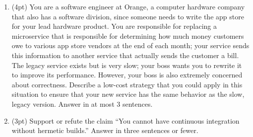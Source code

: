 \documentclass{report}
\newif\ifkey
\newcommand{\answervvshort}[1]{\ifkey\color{red}\underline{\textbf{#1}}\color{black}\else\underline{\hspace{0.5in}}\fi\xspace}
\newcommand{\answerlong}[1]{\ifkey\color{red}\textbf{#1}\color{black}\else\vspace{0.5in}\fi\xspace}
\newcommand*{\pts}[1]{\addtocounter{points}{#1}(#1pt)}
\begin{document}
\begin{spacing}{1.4}
\begin{enumerate}[leftmargin=*]
  \begin{lstlisting}[escapechar=\%]
def f(a, b, c) {
                   [ a -> %\answervvshort{T}%, b -> %\answervvshort{T}%, c -> %\answervvshort{T}%, d -> %\answervvshort{T}% ]
  if (*) {
                   [ a -> %\answervvshort{T}%, b -> %\answervvshort{T}%, c -> %\answervvshort{T}%, d -> %\answervvshort{T}% ]
    d = a + b;
                   [ a -> %\answervvshort{U}%, b -> %\answervvshort{U}%, c -> %\answervvshort{T}%, d -> %\answervvshort{T}% ]
  } else {
                   [ a -> %\answervvshort{T}%, b -> %\answervvshort{T}%, c -> %\answervvshort{T}%, d -> %\answervvshort{T}% ]
    d = a + c;
                   [ a -> %\answervvshort{U}%, b -> %\answervvshort{T}%, c -> %\answervvshort{U}%, d -> %\answervvshort{T}% ]
  }
                   [ a -> %\answervvshort{U}%, b -> %\answervvshort{T}%, c -> %\answervvshort{T}%, d -> %\answervvshort{T}% ]
  return d;
                   [ a -> %\answervvshort{U}%, b -> %\answervvshort{T}%, c -> %\answervvshort{T}%, d -> %\answervvshort{U}% ]
}
  \end{lstlisting}

\item \pts{4} You are a software engineer at Orange, a computer hardware company that also has a software division, since someone
  needs to write the app store for your lead hardware product. You are responsible for replacing a microservice that is responsible
  for determining how much money customers owe to various app store vendors at the end of each month; your service sends this information
  to another service that actually sends the customer a bill. The legacy service exists but is very slow; your boss wants you to rewrite
  it to improve its performance. However, your boss is also extremely concerned about correctness. Describe a low-cost strategy that you
  could apply in this situation to ensure that your new service has the same behavior as the slow, legacy version. Answer in at most 3 sentences.
  \\\answerlong{The correct thing to do here is to apply differential testing (aka ``tests for free''): log all traffic to the old service,
    and check that the new service produces the same answers as the old one for each input for some period of time (until your boss is
    satisfied, probably).}

\item \pts{3} Support or refute the claim ``You cannot have continuous integration without hermetic builds.''
  Answer in three sentences or fewer.\\
  \answerlong{Likely support. Continuous integration does not work well without hermetic builds, because to test in CI you need to be able to build from
    scratch.}
  

\end{enumerate}
\end{spacing}
\end{document}
